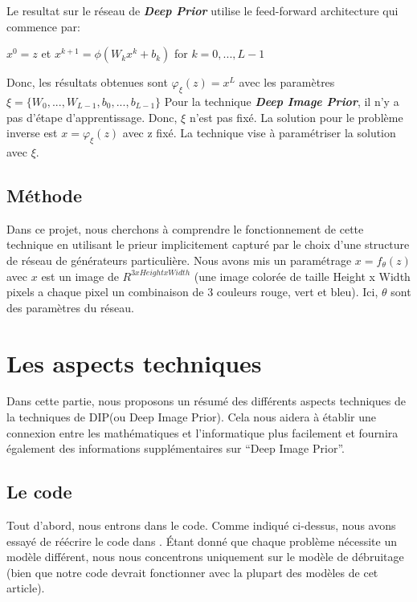 \documentclass[
  11pt,
  dvipsnames]{article}
\begin{document}
Le resultat sur le réseau de \textbf{\emph{Deep Prior}} utilise le feed-forward architecture qui commence par:

\begin{center} $x^0 = z$    et    $x^{k+1} = \phi (W_k x^k + b_k)$ for $k = 0,...,L-1$  \end{center}

Donc, les résultats obtenues sont \(\varphi_\xi(z) = x^L\) avec les paramètres \(\xi = \{W_0,...,W_{L-1},b_0,...,b_{L-1}\}\)
Pour la technique \textbf{\emph{Deep Image Prior}}, il n'y a pas d'étape d'apprentissage. Donc, \(\xi\) n'est pas fixé.
La solution pour le problème inverse est \(x=\varphi_\xi(z)\) avec z fixé. La technique vise à paramétriser
la solution avec \(\xi\).

\hypertarget{muxe9thode}{%
\subsection{Méthode}\label{muxe9thode}}

Dans ce projet, nous cherchons à comprendre le fonctionnement de cette technique
en utilisant le prieur implicitement capturé par le choix d'une structure de réseau de générateurs particulière.
Nous avons mis un paramétrage \(x = f_\theta(z)\) avec \(x\) est un image de \(R^{3xHeightxWidth}\) (une image colorée de taille
Height x Width pixels a chaque pixel un combinaison de 3 couleurs rouge, vert et bleu).
Ici, \(\theta\) sont des paramètres du réseau.

\hypertarget{les-aspects-techniques}{%
\section{Les aspects techniques}\label{les-aspects-techniques}}

Dans cette partie, nous proposons un résumé des différents aspects techniques de la techniques de DIP(ou Deep Image Prior).
Cela nous aidera à établir une connexion entre les mathématiques et l'informatique plus facilement
et fournira également des informations supplémentaires sur ``Deep Image Prior''.

\hypertarget{le-code}{%
\subsection{Le code}\label{le-code}}

Tout d'abord, nous entrons dans le code. Comme indiqué ci-dessus, nous avons essayé de réécrire le code dans \autocite{1711.10925}.
Étant donné que chaque problème nécessite un modèle différent, nous nous concentrons uniquement sur le modèle de débruitage
(bien que notre code devrait fonctionner avec la plupart des modèles de cet article).
\end{document}

